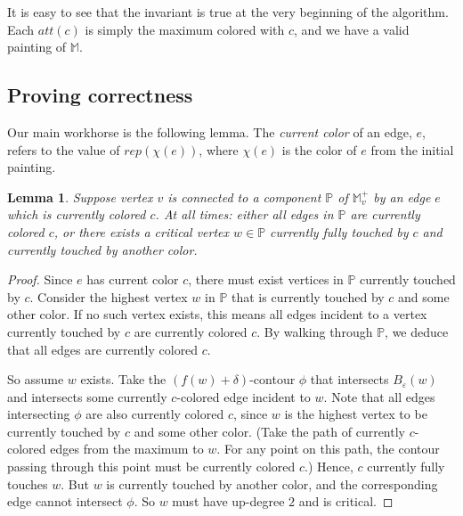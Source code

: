 \documentclass[11pt]{article}
\newcommand{\ignore}[1]{}
\newtheorem{claim}[theorem]{Claim}
\newtheorem{lemma}[theorem]{Lemma}
\theoremstyle{definition}
\newcommand{\cC}{{\cal C}}
\newcommand{\cJ}{{\cal J}}
\newcommand{\MM}{\mathbb{M}}
\newcommand{\PP}{\mathbb{P}}
\newcommand{\eps}{\varepsilon}
\newcommand{\Thm}[1]{\hyperref[thm:#1]{Theorem~\ref*{thm:#1}}} %
\newcommand{\h}{att}
\newcommand{\pal}{P}
\newcommand{\rep}{rep}
\begin{document}
{\medskip
It is easy to see that the invariant is true at the very beginning of the algorithm.
Each $\h(c)$ is simply the maximum colored with $c$, and we have a valid painting of $\MM$.
}


\subsection{Proving correctness} \label{sec:correct}

\ignore{
\begin{claim} \label{clm:process} Assume the invariant. Any vertex with a non-increasing path to some $\h(c)$
for $c \in \pal$ has been processed.
\end{claim}

\begin{proof} This is a direct consequence of \Thm{carr-mono}, which relates monotone paths in $\MM$ to $\cC(\MM)$.
Since the subtree of $\cJ(\MM)$ (which is basically the subtree of $\cC(\MM)$) rooted at $\h(c)$ 
has been found, all vertices in this subtree must be processed. These are all the vertices with non-increasing paths
to $\h(c)$ in $\cC(\MM)$, which by \Thm{carr-mono} is the same as those in $\cC(\MM)$.
\end{proof}
}

Our main workhorse is the following lemma. The \emph{current color} of an edge, $e$, refers to the value of $\rep(\chi(e))$, 
where $\chi(e)$ is the color of $e$ from the initial painting.

\begin{lemma} \label{lem:full} Suppose vertex $v$ is connected to a component $\PP$ of $\MM^+_v$
by an edge $e$ which is currently colored $c$. At all times: either all edges in $\PP$ are currently colored $c$, or there
exists a critical vertex $w \in \PP$ currently fully touched by $c$ and currently touched by another color.
\end{lemma}

\begin{proof} Since $e$ has current color $c$,
there must exist vertices in $\PP$ currently touched by $c$. Consider the highest
vertex $w$ in $\PP$ that is currently touched by $c$ and some other color. If no such vertex exists,
this means all edges incident to a vertex currently touched by $c$ are currently colored $c$. By walking through
$\PP$, we deduce that all edges are currently colored $c$. 

So assume $w$ exists. Take the $(f(w)+\delta)$-contour $\phi$ that intersects $B_\eps(w)$
and intersects some currently $c$-colored edge incident to $w$. Note that all edges intersecting $\phi$ are also currently colored $c$,
since $w$ is the highest vertex to be currently touched by $c$ and some other color. (Take the path of currently $c$-colored
edges from the maximum to $w$. For any point on this path, the contour passing through this point must
be currently colored $c$.) Hence, $c$ currently fully touches $w$. 
But $w$ is currently touched by another color, and the corresponding edge cannot intersect $\phi$. So $w$
must have up-degree $2$ and is critical.
\end{proof}
\end{document}
